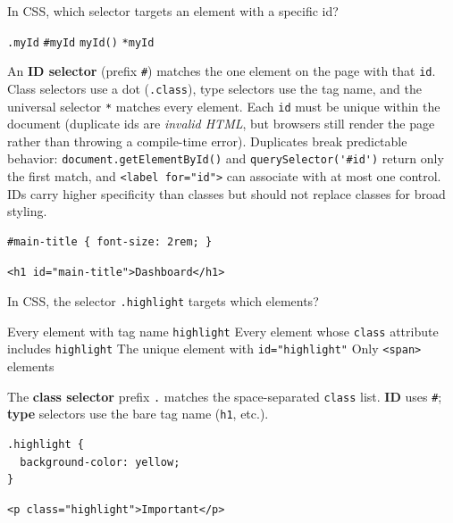 \question[4]
In CSS, which selector targets an element with a specific id?
\begin{choices}
  \choice \texttt{.myId}
  \CorrectChoice \texttt{\#myId}
  \choice \texttt{myId()}
  \choice \texttt{*myId}
\end{choices}
\begin{solution}
  An \textbf{ID selector} (prefix \texttt{\#}) matches the one element on the page with that \texttt{id}. Class selectors use a dot (\texttt{.class}), type selectors use the tag name, and the universal selector \lstinline[style=cssinline]|*| matches every element. Each \texttt{id} must be unique within the document (duplicate ids are \emph{invalid HTML}, but browsers still render the page rather than throwing a compile-time error). Duplicates break predictable behavior: \lstinline[style=jsinline]|document.getElementById()| and \lstinline[style=jsinline]|querySelector('#id')| return only the first match, and \lstinline[style=htmlinline]|<label for="id">| can associate with at most one control. IDs carry higher specificity than classes but should not replace classes for broad styling.
\begin{lstlisting}[style=cssinline]
#main-title { font-size: 2rem; }
\end{lstlisting}
\begin{lstlisting}[style=htmlinline]
<h1 id="main-title">Dashboard</h1>
\end{lstlisting}
\end{solution}

\question[4]
In CSS, the selector \texttt{.highlight} targets which elements?
\begin{choices}
  \choice Every element with tag name \texttt{highlight}
  \CorrectChoice Every element whose \texttt{class} attribute includes \texttt{highlight}
  \choice The unique element with \texttt{id="highlight"}
  \choice Only \texttt{<span>} elements
\end{choices}
\begin{solution}
  The \textbf{class selector} prefix \texttt{.} matches the space-separated \texttt{class} list. \textbf{ID} uses \texttt{\#}; \textbf{type} selectors use the bare tag name (\texttt{h1}, etc.).
\begin{lstlisting}[style=cssinline]
.highlight {
  background-color: yellow;
}
\end{lstlisting}
\begin{lstlisting}[style=htmlinline]
<p class="highlight">Important</p>
\end{lstlisting}
\end{solution}

